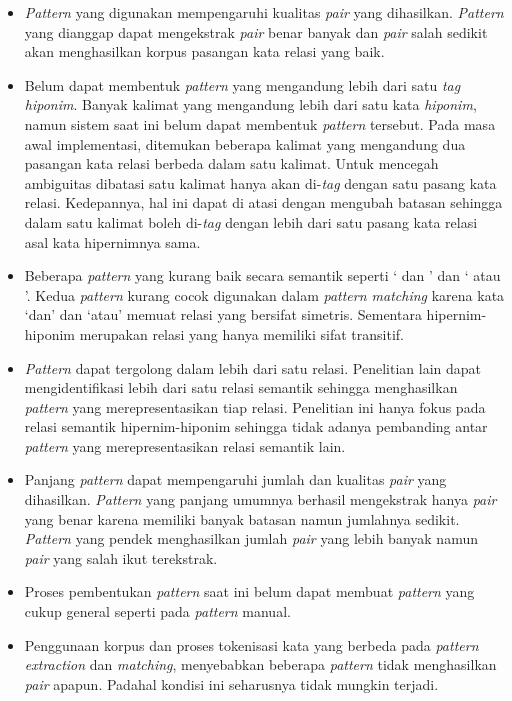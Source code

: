 \begin{itemize}
  \item \textit{Pattern} yang digunakan mempengaruhi kualitas \textit{pair} yang dihasilkan. \textit{Pattern} yang dianggap dapat mengekstrak \textit{pair} benar banyak dan \textit{pair} salah sedikit akan menghasilkan korpus pasangan kata relasi yang baik.
  \item Belum dapat membentuk \textit{pattern} yang mengandung lebih dari satu \textit{tag hiponim}. Banyak kalimat yang mengandung lebih dari satu kata \textit{hiponim}, namun sistem saat ini belum dapat membentuk \textit{pattern} tersebut. Pada masa awal implementasi, ditemukan beberapa kalimat yang mengandung dua pasangan kata relasi berbeda dalam satu kalimat. Untuk mencegah ambiguitas dibatasi satu kalimat hanya akan di-\textit{tag} dengan satu pasang kata relasi. Kedepannya, hal ini dapat di atasi dengan mengubah batasan sehingga dalam satu kalimat boleh di-\textit{tag} dengan lebih dari satu pasang kata relasi asal kata hipernimnya sama. 
  \item Beberapa \textit{pattern} yang kurang baik secara semantik seperti `{\tagHypernym} dan {\tagHyponym}' dan  `{\tagHypernym} atau {\tagHyponym}'. Kedua \textit{pattern} kurang cocok digunakan dalam \textit{pattern matching} karena kata `dan' dan `atau' memuat relasi yang bersifat simetris. Sementara hipernim-hiponim merupakan relasi yang hanya memiliki sifat transitif.
  \item \textit{Pattern} dapat tergolong dalam lebih dari satu relasi.   Penelitian lain dapat mengidentifikasi lebih dari satu relasi semantik sehingga menghasilkan \textit{pattern} yang merepresentasikan tiap relasi. Penelitian ini hanya fokus pada relasi semantik hipernim-hiponim sehingga tidak adanya pembanding antar \textit{pattern} yang merepresentasikan relasi semantik lain.
  \item Panjang \textit{pattern} dapat mempengaruhi jumlah dan kualitas \textit{pair} yang dihasilkan. \textit{Pattern} yang panjang umumnya berhasil mengekstrak hanya \textit{pair} yang benar karena memiliki banyak batasan namun jumlahnya sedikit. \textit{Pattern} yang pendek menghasilkan jumlah \textit{pair} yang lebih banyak namun \textit{pair} yang salah ikut terekstrak.
  \item Proses pembentukan \textit{pattern} saat ini belum dapat membuat \textit{pattern} yang cukup general seperti pada \textit{pattern} manual.
  \item Penggunaan korpus dan proses tokenisasi kata yang berbeda pada \textit{pattern extraction} dan \textit{matching}, menyebabkan beberapa \textit{pattern} tidak menghasilkan \textit{pair} apapun. Padahal kondisi ini seharusnya tidak mungkin terjadi.

\end{itemize}
